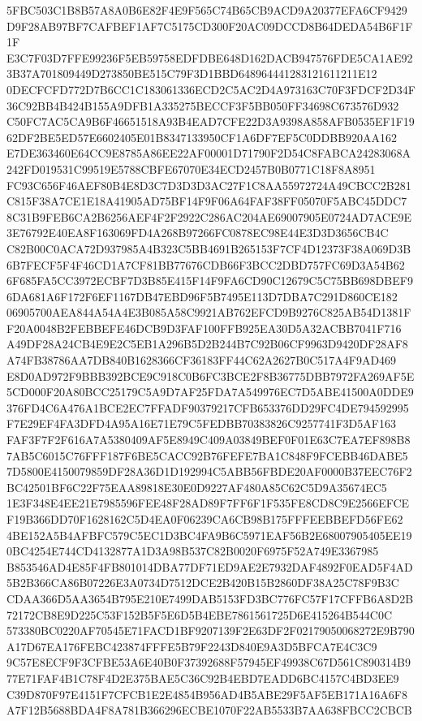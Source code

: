 \documentclass[UTF8,fontset=fandol,zihao=-4,a4paper]{ctexart}
\begin{document}
{{5FBC503C1B8B57A8A0B6E82F4E9F565C74B65CB9ACD9A20377EFA6CF9429D9F28AB97BF7CAFBEF1AF7C5175CD300F20AC09DCCD8B64DEDA54B6F1F1F
E3C7F03D7FFE99236F5EB59758EDFDBE648D162DACB947576FDE5CA1AE923B37A701809449D273850BE515C79F3D1BBD648964441283121611211E12
0DECFCFD772D7B6CC1C183061336ECD2C5AC2D4A973163C70F3FDCF2D34F36C92BB4B424B155A9DFB1A335275BECCF3F5BB050FF34698C673576D932
C50FC7AC5CA9B6F46651518A93B4EAD7CFE22D3A9398A858AFB0535EF1F1962DF2BE5ED57E6602405E01B8347133950CF1A6DF7EF5C0DDBB920AA162
E7DE363460E64CC9E8785A86EE22AF00001D71790F2D54C8FABCA24283068A242FD019531C99519E5788CBFE67070E34ECD2457B0B0771C18F8A8951
FC93C656F46AEF80B4E8D3C7D3D3D3AC27F1C8AA55972724A49CBCC2B281C815F38A7CE1E18A41905AD75BF14F9F06A64FAF38FF05070F5ABC45DDC7
8C31B9FEB6CA2B6256AEF4F2F2922C286AC204AE69007905E0724AD7ACE9E3E76792E40EA8F163069FD4A268B97266FC0878EC98E44E3D3D3656CB4C
C82B00C0ACA72D937985A4B323C5BB4691B265153F7CF4D12373F38A069D3B6B7FECF5F4F46CD1A7CF81BB77676CDB66F3BCC2DBD757FC69D3A54B62
6F685FA5CC3972ECBF7D3B85E415F14F9FA6CD90C12679C5C75BB698DBEF96DA681A6F172F6EF1167DB47EBD96F5B7495E113D7DBA7C291D860CE182
06905700AEA844A54A4E3B085A58C9921AB762EFCD9B9276C825AB54D1381FF20A0048B2FEBBEFE46DCB9D3FAF100FFB925EA30D5A32ACBB7041F716
A49DF28A24CB4E9E2C5EB1A296B5D2B244B7C92B06CF9963D9420DF28AF8A74FB38786AA7DB840B1628366CF36183FF44C62A2627B0C517A4F9AD469
E8D0AD972F9BBB392BCE9C918C0B6FC3BCE2F8B36775DBB7972FA269AF5E5CD000F20A80BCC25179C5A9D7AF25FDA7A549976EC7D5ABE41500A0DDE9
376FD4C6A476A1BCE2EC7FFADF90379217CFB653376DD29FC4DE794592995F7E29EF4FA3DFD4A95A16E71E79C5FEDBB70383826C9257741F3D5AF163
FAF3F7F2F616A7A5380409AF5E8949C409A03849BEF0F01E63C7EA7EF898B87AB5C6015C76FFF187F6BE5CACC92B76FEFE7BA1C848F9FCEBB46DABE5
7D5800E4150079859DF28A36D1D192994C5ABB56FBDE20AF0000B37EEC76F2BC42501BF6C22F75EAA89818E30E0D9227AF480A85C62C5D9A35674EC5
1E3F348E4EE21E7985596FEE48F28AD89F7FF6F1F535FE8CD8C9E2566EFCEF19B366DD70F1628162C5D4EA0F06239CA6CB98B175FFFEEBBEFD56FE62
4BE152A5B4AFBFC579C5EC1D3BC4FA9B6C5971EAF56B2E68007905405EE190BC4254E744CD4132877A1D3A98B537C82B0020F6975F52A749E3367985
B853546AD4E85F4FB801014DBA77DF71ED9AE2E7932DAF4892F0EAD5F4AD5B2B366CA86B07226E3A0734D7512DCE2B420B15B2860DF38A25C78F9B3C
CDAA366D5AA3654B795E210E7499DAB5153FD3BC776FC57F17CFFB6A8D2B72172CB8E9D225C53F152B5F5E6D5B4EBE7861561725D6E415264B544C0C
573380BC0220AF70545E71FACD1BF9207139F2E63DF2F02179050068272E9B790A17D67EA176FEBC423874FFFE5B79F2243D840E9A3D5BFCA7E4C3C9
9C57E8ECF9F3CFBE53A6E40B0F37392688F57945EF49938C67D561C890314B977E71FAF4B1C78F4D2E375BAE5C36C92B4EBD7EADD6BC4157C4BD3EE9
C39D870F97E4151F7CFCB1E2E4854B956AD4B5ABE29F5AF5EB171A16A6F8A7F12B5688BDA4F8A781B366296ECBE1070F22AB5533B7AA638FBCC2CBCB
}}
\end{document}
